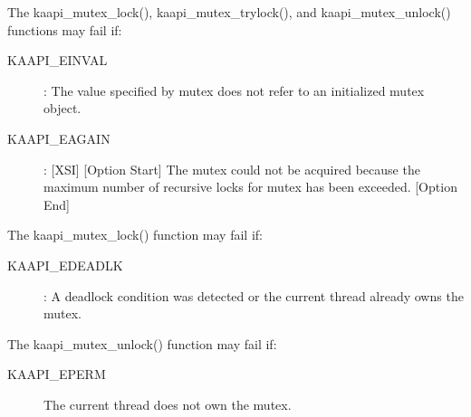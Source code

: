 \begin{description}
The kaapi\_mutex\_lock(), kaapi\_mutex\_trylock(), and kaapi\_mutex\_unlock()
functions may fail if:

\begin{description}
\item [KAAPI\_EINVAL]: The value specified by mutex does not refer to an
  initialized mutex object.
\item [KAAPI\_EAGAIN]: [XSI] [Option Start] The mutex could not be acquired
  because the maximum number of recursive locks for mutex has been
  exceeded. [Option End]
\end{description}

The kaapi\_mutex\_lock() function may fail if:

\begin{description}
\item [KAAPI\_EDEADLK]: A deadlock condition was detected or the current
  thread already owns the mutex.
\end{description}

The kaapi\_mutex\_unlock() function may fail if:

\begin{description}
\item [KAAPI\_EPERM]
    The current thread does not own the mutex. 
\end{description}
\end{description}

